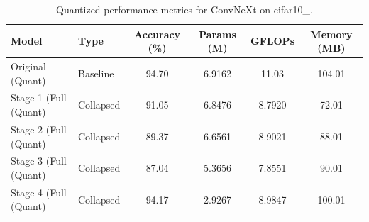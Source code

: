 \begin{table}
\caption{Quantized performance metrics for ConvNeXt on cifar10_.}
\label{tab:ConvNeXt_cifar10__quant}
\begin{tabular}{llcccc}
\toprule
Model & Type & Accuracy (\%) & Params (M) & GFLOPs & Memory (MB) \\
\midrule
Original
(Quant) & Baseline & 94.70 & 6.9162 & 11.03 & 104.01 \\
Stage-1 (Full
(Quant) & Collapsed & 91.05 & 6.8476 & 8.7920 & 72.01 \\
Stage-2 (Full
(Quant) & Collapsed & 89.37 & 6.6561 & 8.9021 & 88.01 \\
Stage-3 (Full
(Quant) & Collapsed & 87.04 & 5.3656 & 7.8551 & 90.01 \\
Stage-4 (Full
(Quant) & Collapsed & 94.17 & 2.9267 & 8.9847 & 100.01 \\
\bottomrule
\end{tabular}
\end{table}
